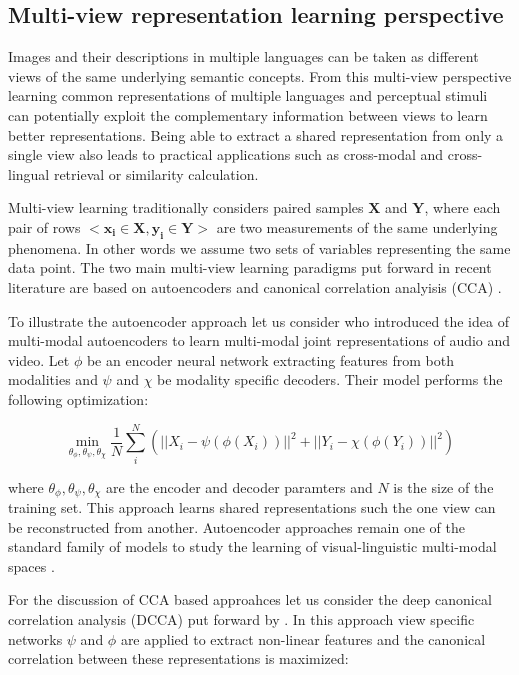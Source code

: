 \subsection{Multi-view representation learning perspective}
\label{sec:multiview}


Images and their descriptions in multiple languages can be taken as different views of the
same underlying semantic concepts. From this multi-view perspective learning common representations
of multiple languages and perceptual stimuli can potentially exploit the complementary information
between views to learn better representations. Being able to extract
a shared representation from only a single view also leads to practical applications such as
cross-modal and cross-lingual retrieval or similarity calculation.

Multi-view learning traditionally considers paired samples $\mathbf{X}$ and $\mathbf{Y}$,
where each pair of rows $<\mathbf{x_i} \in \mathbf{X}, \mathbf{y_i} \in \mathbf{Y}>$ 
are two measurements of the same
underlying phenomena. In other words we assume two sets of variables representing the 
same data point. The two main multi-view learning paradigms put forward in recent literature are based on 
autoencoders and canonical correlation analyisis (CCA) \citep{wang2015deep}.

To illustrate the autoencoder approach let us consider \cite{ngiam2011multimodal} who introduced the idea
of multi-modal autoencoders to learn multi-modal joint representations of audio and video. Let
$\phi$ be an encoder neural network extracting features from both modalities and $\psi$ and $\chi$ be 
modality specific decoders. Their model performs the following optimization:

\begin{equation}
\min_ {\theta_{\phi}, \theta_{\psi}, \theta_{\chi}} \frac{1}{N} \sum^N_i (||X_i - \psi(\phi(X_i))||^2 +||Y_i - \chi(\phi(Y_i))||^2)
\end{equation}

where $\theta_{\phi}, \theta_{\psi}, \theta_{\chi}$ are the encoder and decoder paramters and $N$
is the size of the training set.
This approach learns shared representations such the one view can be reconstructed from another.
Autoencoder approaches  remain one of the standard family of models
to study the learning of visual-linguistic multi-modal spaces \citep{silberer2014learning,silberer2017visually,wang2018associative}.

For the discussion of CCA based approahces let us consider the deep canonical correlation analysis (DCCA) 
put forward by \cite{andrew2013deep}.  In this approach view
specific networks $\psi$ and $\phi$ are applied to extract non-linear features
and the canonical correlation between these representations is maximized:

